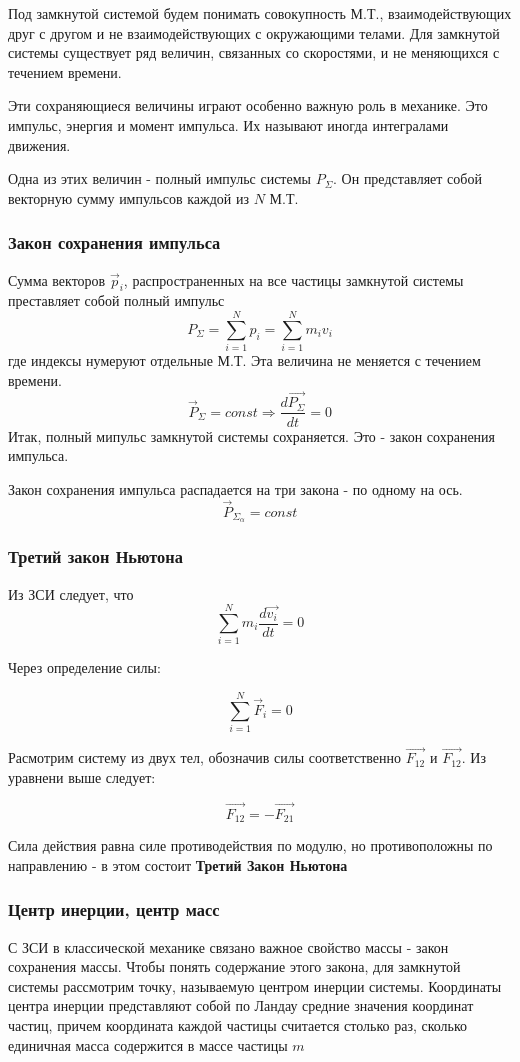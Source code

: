 \documentclass{article}
\begin{document}
Под замкнутой системой будем понимать совокупность М.Т., взаимодействующих друг с другом и не взаимодействующих с окружающими телами. Для замкнутой системы существует ряд величин, связанных со скоростями, и не меняющихся с течением времени.

Эти сохраняющиеся величины играют особенно важную роль в механике. Это импульс, энергия и момент импульса. Их называют иногда интегралами движения.

Одна из этих величин - полный импульс системы $P_\Sigma$. Он представляет собой векторную сумму импульсов каждой из $N$ М.Т.

\subsubsection{Закон сохранения импульса}
Сумма векторов $\vec p_i$, распространенных на все частицы замкнутой системы преставляет собой полный импульс 
$$P_\Sigma = \sum_{i=1}^Np_i = \sum_{i=1}^Nm_iv_i$$
где индексы нумеруют отдельные М.Т. Эта величина не меняется с течением времени. $$\vec P_\Sigma = const \Rightarrow \frac{d\vec {P_\Sigma}}{dt} = 0$$
Итак, полный мипульс замкнутой системы сохраняется. Это - закон сохранения импульса.

Закон сохранения импульса распадается на три закона - по одному на ось.
$$\vec P_{\Sigma_\alpha} = const$$

\subsubsection{Третий закон Ньютона}

Из ЗСИ следует, что 
$$\sum_{i=1}^{N}{m_i\frac{d\vec{v_i}}{dt}} = 0$$

Через определение силы:

$$\sum_{i=1}^{N} \vec F_i = 0$$

Расмотрим систему из двух тел, обозначив силы соответственно $\vec {F_{12}}$ и $\vec{F_{12}}$. Из уравнени выше следует:

$$\vec{F_{12}} = - \vec{F_{21}}$$

Сила действия равна силе противодействия по модулю, но противоположны по направлению - в этом состоит \textbf{Третий Закон Ньютона}

\subsubsection{Центр инерции, центр масс}

С ЗСИ в классической механике связано важное свойство массы - закон сохранения массы. Чтобы понять содержание этого закона, для замкнутой системы рассмотрим точку, называемую центром инерции системы. Координаты центра инерции представляют собой по Ландау средние значения координат частиц, причем координата каждой частицы считается столько раз, сколько единичная масса содержится в массе частицы $m$
\end{document}
